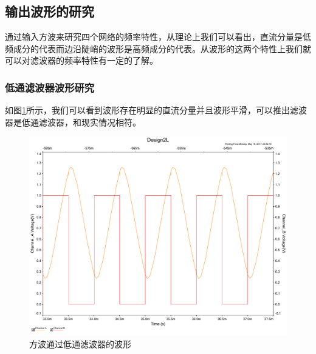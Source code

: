 \documentclass[UTF8,a4paper]{paper}
\begin{document}
\begin{multicols}{2}
\subsection{输出波形的研究}
通过输入方波来研究四个网络的频率特性，从理论上我们可以看出，直流分量是低频成分的代表而边沿陡峭的波形是高频成分的代表。从波形的这两个特性上我们就可以对滤波器的频率特性有一定的了解。
\subsubsection{低通滤波器波形研究}
如图\ref{BIL}所示，我们可以看到波形存在明显的直流分量并且波形平滑，可以推出滤波器是低通滤波器，和现实情况相符。
\begin{figure}[H]
\centering
\includegraphics[width=\columnwidth]{2L.pdf}
\caption{方波通过低通滤波器的波形}
\label{BIL}
\end{figure}

\end{multicols}
\end{document}
